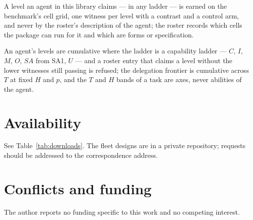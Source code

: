 \documentclass[11pt]{article}
\theoremstyle{definition}
\begin{document}
A level an agent in this library claims --- in any ladder --- is earned on the benchmark's cell grid, one witness per level with a contrast and a control arm, and never by the roster's description of the agent; the roster records which cells the package can run for it and which are forms or specification.

An agent's levels are cumulative where the ladder is a capability ladder --- $C$, $I$, $M$, $O$, $SA$ from SA1, $U$ --- and a roster entry that claims a level without the lower witnesses still passing is refused; the delegation frontier is cumulative across $T$ at fixed $H$ and $p$, and the $T$ and $H$ bands of a task are axes, never abilities of the agent.

\section*{Availability}

See Table~\ref{tab:downloads}. The fleet designs are in a private repository; requests should be addressed to the correspondence address.

\section*{Conflicts and funding}

The author reports no funding specific to this work and no competing interest.



\end{document}

